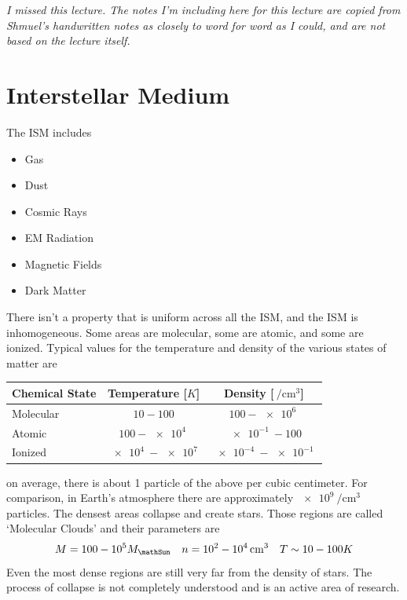 \emph{I missed this lecture. The notes I'm including here for this lecture are copied from Shmuel's handwritten notes as closely to word for word as I could, and are not based on the lecture itself.}
\section{Interstellar Medium}
The ISM includes
\begin{itemize}
    \item Gas
    \item Dust
    \item Cosmic Rays
    \item EM Radiation
    \item Magnetic Fields
    \item Dark Matter
\end{itemize}
There isn't a property that is uniform across all the ISM, and the ISM is inhomogeneous. Some areas are molecular, some are atomic, and some are ionized. Typical values for the temperature and density of the various states of matter are
\begin{table}[!htb]
    \centering
    \begin{tabular}{l|c|c}
        Chemical State & Temperature [\(K\)] & Density [\(\qty{}{\per\centi\meter^3}\)] \\
        \hline
        Molecular & \(10-100\) & \(100-\qty{e6}{}\) \\
        Atomic & \(100-\qty{e4}{}\) & \(\qty{e-1}{} - 100\) \\
        Ionized & \(\qty{e4}{}-\qty{e7}{}\) & \(\qty{e-4}{}-\qty{e-1}{}\)
    \end{tabular}
\end{table}
on average, there is about 1 particle of the above per cubic centimeter. For comparison, in Earth's atmosphere there are approximately \(\qty{e9}{\per\centi\meter^3}\) particles. The densest areas collapse and create stars. Those regions are called `Molecular Clouds' and their parameters are
\begin{align}
    M = 100-\qty{e5}{}M_\mathSun && n = \qty{e2}{}-\qty{e4}{\per\centi\meter^3} && T \sim 10-100 K
\end{align}
Even the most dense regions are still very far from the density of stars. The process of collapse is not completely understood and is an active area of research.
